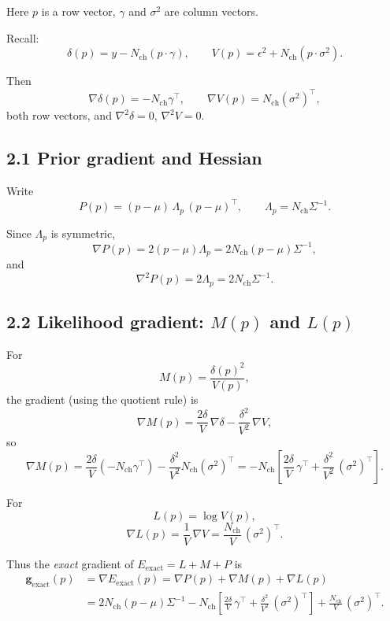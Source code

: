 \documentclass[11pt]{article}
\begin{document}
Here $p$ is a row vector, $\gamma$ and $\sigma^2$ are column vectors.

Recall:
\[
  \delta(p) = y - N_{\text{ch}}(p\cdot\gamma),
  \qquad
  V(p) = \epsilon^2 + N_{\text{ch}}(p\cdot\sigma^2).
\]

Then
\[
  \nabla\delta(p) = -N_{\text{ch}}\gamma^\top,
  \qquad
  \nabla V(p) = N_{\text{ch}}(\sigma^2)^\top,
\]
both row vectors, and $\nabla^2\delta = 0$, $\nabla^2 V = 0$.

\subsection*{2.1 Prior gradient and Hessian}

Write
\[
  P(p) = (p-\mu)\,\Lambda_p\,(p-\mu)^\top,
  \qquad
  \Lambda_p = N_{\text{ch}}\Sigma^{-1}.
\]

Since $\Lambda_p$ is symmetric,
\[
  \nabla P(p) = 2(p-\mu)\Lambda_p
              = 2N_{\text{ch}}(p-\mu)\Sigma^{-1},
\]
and
\[
  \nabla^2 P(p) = 2\Lambda_p = 2N_{\text{ch}}\Sigma^{-1}.
\]

\subsection*{2.2 Likelihood gradient: $M(p)$ and $L(p)$}

For
\[
  M(p) = \frac{\delta(p)^2}{V(p)},
\]
the gradient (using the quotient rule) is
\[
  \nabla M(p)
  =
  \frac{2\delta}{V}\,\nabla\delta
  - \frac{\delta^2}{V^2}\,\nabla V,
\]
so
\[
  \nabla M(p)
  =
  \frac{2\delta}{V}(-N_{\text{ch}}\gamma^\top)
  - \frac{\delta^2}{V^2}N_{\text{ch}}(\sigma^2)^\top
  =
  -N_{\text{ch}}
  \left[
    \frac{2\delta}{V}\,\gamma^\top
    + \frac{\delta^2}{V^2}\,(\sigma^2)^\top
  \right].
\]

For
\[
  L(p) = \log V(p),
\]
\[
  \nabla L(p)
  = \frac{1}{V}\,\nabla V
  = \frac{N_{\text{ch}}}{V}\,(\sigma^2)^\top.
\]

Thus the \emph{exact} gradient of $E_{\text{exact}} = L + M + P$ is
\[
  \begin{aligned}
    \mathbf{g}_{\text{exact}}(p)
    &= \nabla E_{\text{exact}}(p)
     = \nabla P(p) + \nabla M(p) + \nabla L(p)\\[3pt]
    &=
    2N_{\text{ch}}(p-\mu)\Sigma^{-1}
    - N_{\text{ch}}
      \left[
        \frac{2\delta}{V}\,\gamma^\top
        + \frac{\delta^2}{V^2}\,(\sigma^2)^\top
      \right]
    + \frac{N_{\text{ch}}}{V}\,(\sigma^2)^\top.
  \end{aligned}
\]
\end{document}
